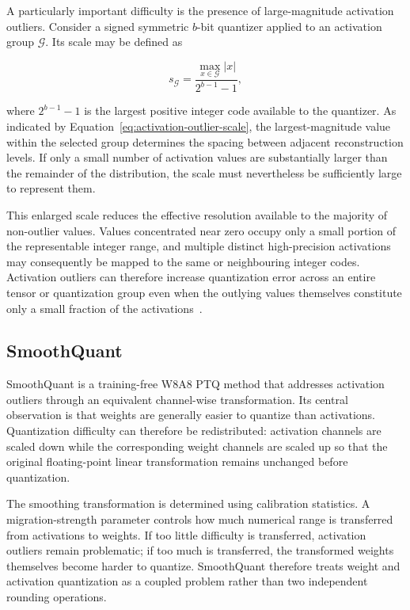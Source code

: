 A particularly important difficulty is the presence of
large-magnitude activation outliers\cite{dettmers2022llmint88bitmatrixmultiplication}. Consider a signed symmetric
\(b\)-bit quantizer applied to an activation group
\(\mathcal{G}\). Its scale may be defined as

\begin{equation}
s_{\mathcal{G}}
=
\frac{
\displaystyle\max_{x\in\mathcal{G}} |x|
}{
2^{b-1}-1
},
\label{eq:activation-outlier-scale}
\end{equation}

where \(2^{b-1}-1\) is the largest positive integer code available to
the quantizer. As indicated by
Equation~\eqref{eq:activation-outlier-scale}, the largest-magnitude
value within the selected group determines the spacing between adjacent
reconstruction levels. If only a small number of activation values are
substantially larger than the remainder of the distribution, the scale
must nevertheless be sufficiently large to represent them\cite{wei-etal-2023-outlier}.

This enlarged scale reduces the effective resolution available to the
majority of non-outlier values. Values concentrated near zero occupy
only a small portion of the representable integer range, and multiple
distinct high-precision activations may consequently be mapped to the
same or neighbouring integer codes. Activation outliers can therefore
increase quantization error across an entire tensor or quantization
group even when the outlying values themselves constitute only a small
fraction of the activations\cite{wei-etal-2023-outlier}~\cite{wei2023outliersuppressionpushinglimit}.

\subsection{SmoothQuant}
SmoothQuant is a training-free W8A8 {PTQ} method that addresses
activation outliers through an equivalent channel-wise transformation. Its central observation is that weights
are generally easier to quantize than activations. Quantization
difficulty can therefore be redistributed: activation channels are
scaled down while the corresponding weight channels are scaled up so
that the original floating-point linear transformation remains
unchanged before quantization.

The smoothing transformation is determined using calibration
statistics. A migration-strength parameter controls how much numerical
range is transferred from activations to weights. If too little
difficulty is transferred, activation outliers remain problematic; if
too much is transferred, the transformed weights themselves become
harder to quantize. SmoothQuant therefore treats weight and activation
quantization as a coupled problem rather than two independent
rounding operations\cite{xiao2023icml-smoothquant}.

